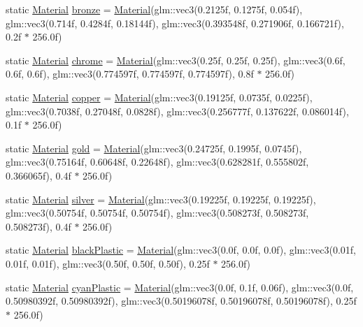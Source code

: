 \begin{DoxyCompactItemize}
\item 
static \mbox{\hyperlink{struct_material}{Material}} \mbox{\hyperlink{struct_material_ac43b7a8224541fce0de9de18ff4add8c}{bronze}} = \mbox{\hyperlink{struct_material}{Material}}(glm\+::vec3(0.\+2125f, 0.\+1275f, 0.\+054f), glm\+::vec3(0.\+714f, 0.\+4284f, 0.\+18144f), glm\+::vec3(0.\+393548f, 0.\+271906f, 0.\+166721f), 0.\+2f $\ast$ 256.\+0f)
\item 
static \mbox{\hyperlink{struct_material}{Material}} \mbox{\hyperlink{struct_material_a49a439730bf4934813e885d6458e496d}{chrome}} = \mbox{\hyperlink{struct_material}{Material}}(glm\+::vec3(0.\+25f, 0.\+25f, 0.\+25f), glm\+::vec3(0.\+6f, 0.\+6f, 0.\+6f), glm\+::vec3(0.\+774597f, 0.\+774597f, 0.\+774597f), 0.\+8f $\ast$ 256.\+0f)
\item 
static \mbox{\hyperlink{struct_material}{Material}} \mbox{\hyperlink{struct_material_aad09f525699803a4ed3e7cd6afd3f8a5}{copper}} = \mbox{\hyperlink{struct_material}{Material}}(glm\+::vec3(0.\+19125f, 0.\+0735f, 0.\+0225f), glm\+::vec3(0.\+7038f, 0.\+27048f, 0.\+0828f), glm\+::vec3(0.\+256777f, 0.\+137622f, 0.\+086014f), 0.\+1f $\ast$ 256.\+0f)
\item 
static \mbox{\hyperlink{struct_material}{Material}} \mbox{\hyperlink{struct_material_ae23eaaf9a27a2b9d9a218d1ea3f803e0}{gold}} = \mbox{\hyperlink{struct_material}{Material}}(glm\+::vec3(0.\+24725f, 0.\+1995f, 0.\+0745f), glm\+::vec3(0.\+75164f, 0.\+60648f, 0.\+22648f), glm\+::vec3(0.\+628281f, 0.\+555802f, 0.\+366065f), 0.\+4f $\ast$ 256.\+0f)
\item 
static \mbox{\hyperlink{struct_material}{Material}} \mbox{\hyperlink{struct_material_aef9dfcd5c4f7aaa53ee68831a19f68ca}{silver}} = \mbox{\hyperlink{struct_material}{Material}}(glm\+::vec3(0.\+19225f, 0.\+19225f, 0.\+19225f), glm\+::vec3(0.\+50754f, 0.\+50754f, 0.\+50754f), glm\+::vec3(0.\+508273f, 0.\+508273f, 0.\+508273f), 0.\+4f $\ast$ 256.\+0f)
\item 
static \mbox{\hyperlink{struct_material}{Material}} \mbox{\hyperlink{struct_material_a7d31f06894812f15ccca287f46703b99}{black\+Plastic}} = \mbox{\hyperlink{struct_material}{Material}}(glm\+::vec3(0.\+0f, 0.\+0f, 0.\+0f), glm\+::vec3(0.\+01f, 0.\+01f, 0.\+01f), glm\+::vec3(0.\+50f, 0.\+50f, 0.\+50f), 0.\+25f $\ast$ 256.\+0f)
\item 
static \mbox{\hyperlink{struct_material}{Material}} \mbox{\hyperlink{struct_material_a24c31c15d55457a83429418bb8745e03}{cyan\+Plastic}} = \mbox{\hyperlink{struct_material}{Material}}(glm\+::vec3(0.\+0f, 0.\+1f, 0.\+06f), glm\+::vec3(0.\+0f, 0.\+50980392f, 0.\+50980392f), glm\+::vec3(0.\+50196078f, 0.\+50196078f, 0.\+50196078f), 0.\+25f $\ast$ 256.\+0f)

\end{DoxyCompactItemize}
